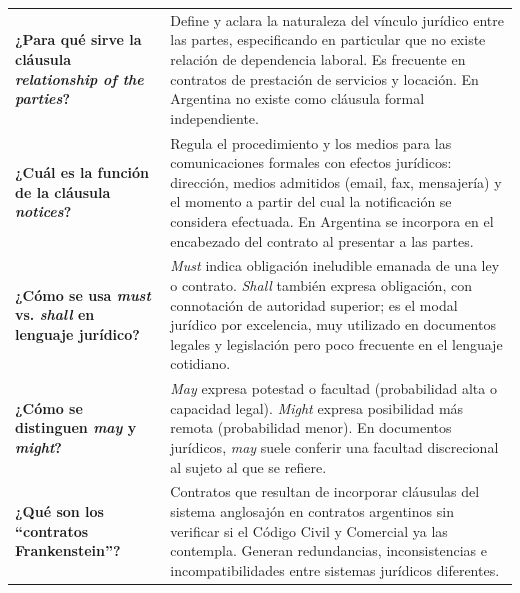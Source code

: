 \documentclass[12pt,oneside]{book}
\begin{document}
\begin{table}[H]
\begin{tabularx}{\textwidth}{
    >{\raggedright\arraybackslash}p{}
    >{\raggedright\arraybackslash}X
}
\textbf{¿Para qué sirve la cláusula \textit{relationship of the parties}?} &
Define y aclara la naturaleza del vínculo jurídico entre las partes,
especificando en particular que no existe relación de dependencia laboral.
Es frecuente en contratos de prestación de servicios y locación. En
Argentina no existe como cláusula formal independiente. \\
\addlinespace

\textbf{¿Cuál es la función de la cláusula \textit{notices}?} &
Regula el procedimiento y los medios para las comunicaciones formales con
efectos jurídicos: dirección, medios admitidos (email, fax, mensajería) y
el momento a partir del cual la notificación se considera efectuada. En
Argentina se incorpora en el encabezado del contrato al presentar a las partes. \\
\addlinespace

\textbf{¿Cómo se usa \textit{must} vs. \textit{shall} en lenguaje jurídico?} &
\textit{Must} indica obligación ineludible emanada de una ley o contrato.
\textit{Shall} también expresa obligación, con connotación de autoridad
superior; es el modal jurídico por excelencia, muy utilizado en documentos
legales y legislación pero poco frecuente en el lenguaje cotidiano. \\
\addlinespace

\textbf{¿Cómo se distinguen \textit{may} y \textit{might}?} &
\textit{May} expresa potestad o facultad (probabilidad alta o capacidad legal).
\textit{Might} expresa posibilidad más remota (probabilidad menor). En
documentos jurídicos, \textit{may} suele conferir una facultad discrecional
al sujeto al que se refiere. \\
\addlinespace

\textbf{¿Qué son los ``contratos Frankenstein''?} &
Contratos que resultan de incorporar cláusulas del sistema anglosajón en
contratos argentinos sin verificar si el Código Civil y Comercial ya las
contempla. Generan redundancias, inconsistencias e incompatibilidades entre
sistemas jurídicos diferentes. \\

\midrule


\end{tabularx}
\end{table}
\end{document}
